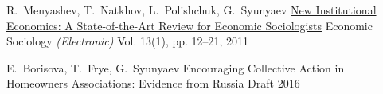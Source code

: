 \begin{cventries}
\end{cventries}



\begin{cventries}

  \cventry
    {R.~Menyashev, T.~Natkhov, L.~Polishchuk, G.~Syunyaev} %
    {\href{https://www.hse.ru/pubs/share/direct/document/59731518}{New Institutional Economics: A State-of-the-Art Review for Economic Sociologists}} %
    {Economic Sociology \emph{(Electronic)}} %
    {Vol. 13(1), pp. 12--21, 2011} %
    {
    }

\end{cventries}

\begin{cventries}

  \cventry
    {E.~Borisova, T.~Frye, G.~Syunyaev} %
    {Encouraging Collective Action in Homeowners Associations: Evidence from Russia} %
    {Draft} %
    {2016} %
    {
    }

\end{cventries}
